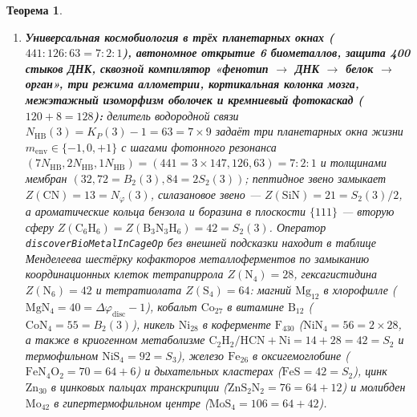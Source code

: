 \documentclass[11pt,a4paper]{article}
\theoremstyle{plain}
\newtheorem{theorem}{Теорема}[section]
\theoremstyle{definition}
\begin{document}
\begin{theorem}
\begin{enumerate}[label=\textbf{(\arabic*)},leftmargin=*]
\item \textbf{Универсальная космобиология в трёх планетарных окнах ($441 : 126 : 63 = 7 : 2 : 1$), автономное открытие 6 биометаллов, защита 400 стыков ДНК, сквозной компилятор «фенотип $\to$ ДНК $\to$ белок $\to$ орган», три режима аллометрии, кортикальная колонка мозга, межэтажный изоморфизм оболочек и кремниевый фотокаскад ($120 + 8 = 128$):}
  делитель водородной связи $N_{\mathrm{HB}}(3) = K_P(3) - 1 = 63 = 7\times 9$ задаёт три планетарных окна жизни $m_{\mathrm{env}} \in \{-1, 0, +1\}$ с шагами фотонного резонанса $(7 N_{\mathrm{HB}}, 2 N_{\mathrm{HB}}, 1 N_{\mathrm{HB}}) = (441 = 3\times 147, 126, 63) = 7 : 2 : 1$ и толщинами мембран $(32, 72 = B_2(3), 84 = 2 S_2(3))$; пептидное звено замыкает $Z(\mathrm{CN}) = 13 = N_\varphi(3)$, силазановое звено --- $Z(\mathrm{SiN}) = 21 = S_2(3)/2$, а ароматические кольца бензола и боразина в плоскости $\{111\}$ --- вторую сферу $Z(\mathrm{C_6H_6}) = Z(\mathrm{B_3N_3H_6}) = 42 = S_2(3)$. Оператор \texttt{discoverBioMetalInCageOp} без внешней подсказки находит в таблице Менделеева шестёрку кофакторов металлоферментов по замыканию координационных клеток тетрапиррола $Z(\mathrm{N_4}) = 28$, гексагистидина $Z(\mathrm{N_6}) = 42$ и тетратиолата $Z(\mathrm{S_4}) = 64$: магний $\mathrm{Mg}_{12}$ в хлорофилле ($\mathrm{MgN_4} = 40 = \Delta\varphi_{\mathrm{disc}} - 1$), кобальт $\mathrm{Co}_{27}$ в витамине $\mathrm{B}_{12}$ ($\mathrm{CoN_4} = 55 = B_2(3)$), никель $\mathrm{Ni}_{28}$ в коферменте $\mathrm{F}_{430}$ ($\mathrm{NiN_4} = 56 = 2\times 28$, а также в криогенном метаболизме $\mathrm{C_2H_2/HCN + Ni} = 14 + 28 = 42 = S_2$ и термофильном $\mathrm{NiS_4} = 92 = S_3$), железо $\mathrm{Fe}_{26}$ в оксигемоглобине ($\mathrm{FeN_4O_2} = 70 = 64 + 6$) и дыхательных кластерах ($\mathrm{FeS} = 42 = S_2$), цинк $\mathrm{Zn}_{30}$ в цинковых пальцах транскрипции ($\mathrm{ZnS_2N_2} = 76 = 64 + 12$) и молибден $\mathrm{Mo}_{42}$ в гипертермофильном центре ($\mathrm{MoS_4} = 106 = 64 + 42$).


\end{enumerate}
\end{theorem}
\end{document}

